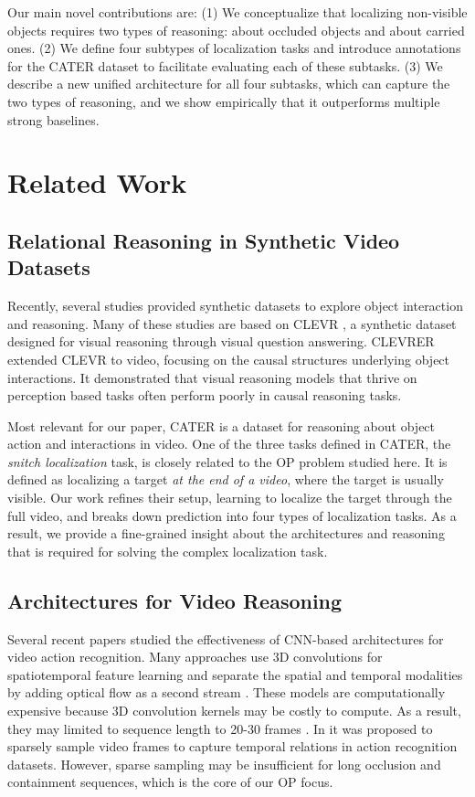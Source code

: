 \documentclass[]{llncs}
\begin{document}
Our main novel contributions are: (1) We conceptualize that localizing non-visible objects requires two types of reasoning: about occluded objects and about carried ones. (2) We define four subtypes of localization tasks and introduce annotations for the CATER dataset to facilitate evaluating each of these subtasks. (3) We describe a new unified architecture for all four subtasks, which can capture the two types of reasoning, and we show empirically that it outperforms multiple strong baselines.

\section{Related Work}

\subsection{Relational Reasoning in Synthetic Video Datasets} Recently, several studies provided synthetic datasets to explore object interaction and reasoning. Many of these studies are based on CLEVR \cite{johnson2017clevr}, a synthetic dataset designed for visual reasoning through visual question answering. CLEVRER \cite{yi2019clevrer} extended CLEVR to video, focusing on the causal structures underlying object interactions. It demonstrated that visual reasoning models that thrive on perception based tasks often perform poorly in causal reasoning tasks.

Most relevant for our paper, CATER \cite{girdhar2019cater} is a dataset for reasoning about object action and interactions in video. One of the three tasks defined in CATER, the \textit{snitch localization} task, is closely related to the OP problem studied here. It is defined as localizing a target \textit{at the end  of a video}, where the target is usually visible. 
Our work refines their setup, learning to localize the target through the full video, and breaks down prediction into four types of localization tasks. As a result, we provide a fine-grained insight about the architectures and reasoning that is required for solving the complex localization task.

\subsection{Architectures for Video Reasoning}
Several recent papers studied the effectiveness of CNN-based architectures for video action recognition. Many approaches use 3D convolutions for spatiotemporal feature learning \cite{carreira2017quo,tran2015learning} and separate the spatial and temporal modalities by adding optical flow as a second stream \cite{feichtenhofer2016spatiotemporal,simonyan2014two}. These models are computationally
expensive because 3D convolution kernels may be costly to compute. As a result, they may limited to sequence length to 20-30 frames \cite{carreira2017quo,tran2015learning}. In \cite{zhou2017temporalrelation} it was proposed to sparsely sample video frames to capture temporal relations in action recognition datasets. However, sparse sampling may be insufficient for long occlusion and containment sequences, which is the core of our OP focus.
\end{document}

